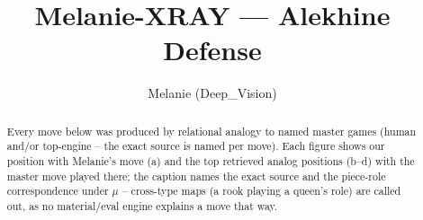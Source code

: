 \documentclass[11pt]{article}
\title{Melanie-XRAY — Alekhine Defense}
\author{Melanie (Deep\_Vision)}
\date{}
\begin{document}
\maketitle

\begin{abstract}Every move below was produced by relational analogy to named master games (human and/or top-engine -- the exact source is named per move). Each figure shows our position with Melanie's move (a) and the top retrieved analog positions (b--d) with the master move played there; the caption names the exact source and the piece-role correspondence under $\mu$ -- cross-type maps (a rook playing a queen's role) are called out, as no material/eval engine explains a move that way.\end{abstract}

\begin{figure}[p]\centering
\begin{subfigure}{0.46\textwidth}\centering
\resizebox{\linewidth}{!}{%
\newchessgame
\chessboard[
  setfen={rnbqk2r/ppp1ppbp/1n1p2p1/4P3/3P4/1B3N2/PPP2PPP/RNBQK2R w KQkq - 4 7},
  showmover=false,
  pgfstyle=straightmove, color=movearrow, markmove={e5-d6}
]}
\caption{}
\end{subfigure}\hfill
\begin{subfigure}{0.46\textwidth}\centering
\resizebox{\linewidth}{!}{%
\newchessgame
\chessboard[
  setfen={rnbqk2r/ppp1ppbp/1n1p2p1/4P3/2PP4/5N2/PP2BPPP/RNBQK2R w KQkq - 1 7},
  showmover=false,
  pgfstyle=straightmove, color=movearrow, markmove={e5-d6}
]}
\caption{}
\end{subfigure}
\\[4pt]
\begin{subfigure}{0.46\textwidth}\centering
\resizebox{\linewidth}{!}{%
\newchessgame
\chessboard[
  setfen={rnbqk2r/ppp1ppbp/1n1p2p1/4P3/2PP4/5N2/PP2BPPP/RNBQK2R w KQkq - 1 7},
  showmover=false,
  pgfstyle=straightmove, color=movearrow, markmove={e5-d6}
]}
\caption{}
\end{subfigure}\hfill
\begin{subfigure}{0.46\textwidth}\centering
\resizebox{\linewidth}{!}{%
\newchessgame
\chessboard[
  setfen={rnbqk2r/ppp1ppbp/1n1p2p1/4P3/2PP4/5N2/PP2BPPP/RNBQK2R w KQkq - 3 7},
  showmover=false,
  pgfstyle=straightmove, color=movearrow, markmove={e5-d6}
]}
\caption{}
\end{subfigure}

\end{figure}
\end{document}
